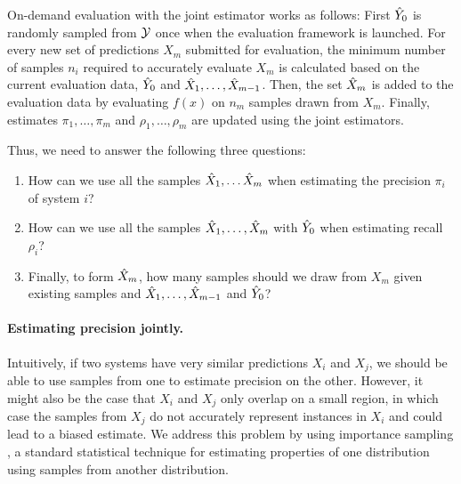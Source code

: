 On-demand evaluation with the joint estimator works as follows:
First ${\hat{Y}}_0$ is randomly sampled from $\mathcal{Y}$ once when the evaluation framework is launched.
For every new set of predictions $X_m$ submitted for evaluation, the minimum number of samples $n_i$ required to accurately evaluate $X_m$ is calculated based on the current evaluation data, ${\hat{Y}}_0$ and ${\hat{X}}_1, \ldots, {\hat{X}}_{m-1}$.
Then, the set ${\hat{X}}_m$ is added to the evaluation data by evaluating $f(x)$ on $n_m$ samples drawn from $X_m$.
Finally, estimates $\pi_1, \ldots, \pi_m$ and $\rho_1, \ldots, \rho_m$ are updated using the joint estimators.

Thus, we need to answer the following three questions:
\begin{enumerate}
  \item How can we use all the samples ${\hat{X}}_1, \ldots {\hat{X}}_m$ when estimating the precision $\pi_i$ of system $i$?
  \item How can we use all the samples ${\hat{X}}_1, \ldots, {\hat{X}}_m$ with ${\hat{Y}}_0$ when estimating recall $\rho_i$?
  \item Finally, to form ${\hat{X}}_m$, how many samples should we draw from $X_m$ given existing samples and ${\hat{X}}_1, \ldots, {\hat{X}}_{m-1}$ and ${\hat{Y}}_0$?
\end{enumerate}

\paragraph{Estimating precision jointly.}
Intuitively, if two systems have very similar predictions $X_i$ and $X_j$, we should be able to use samples from one to estimate precision on the other.
However, it might also be the case that $X_i$ and $X_j$ only overlap on a small region, in which case the samples from $X_j$ do not accurately represent instances in $X_i$ and could lead to a biased estimate.
We address this problem by using importance sampling \citep{owen2013monte}, a standard statistical technique for estimating properties of one distribution using samples from another distribution.

